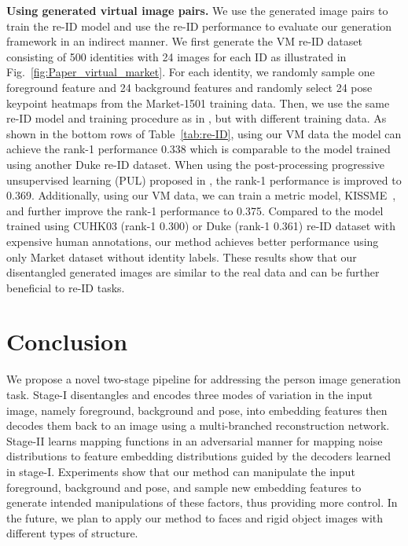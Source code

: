 \documentclass[10pt,twocolumn,letterpaper]{article}
\newcommand{\myparagraph}[1]{\vspace{0.0em}\noindent\textbf{#1}}
\begin{document}
\myparagraph{Using generated virtual image pairs.}
We use the generated image pairs to train the re-ID model and use the re-ID performance to evaluate our generation framework in an indirect manner. 
We first generate the VM re-ID dataset consisting of 500 identities with 24 images for each ID as illustrated in Fig.~\ref{fig:Paper_virtual_market}. 
For each identity, we randomly sample one foreground feature and 24 background features and randomly select 24 pose keypoint heatmaps from the Market-1501 training data.
Then, we use the same re-ID model and training procedure as in \cite{PUL}, but with different training data. 
As shown in the bottom rows of Table~\ref{tab:re-ID}, using our VM data the model can achieve the rank-1 performance 0.338 which is comparable to the model trained using another Duke re-ID dataset. 
When using the post-processing progressive unsupervised learning (PUL) proposed in \cite{PUL}, the rank-1 performance is improved to 0.369. 
Additionally, using our VM data, we can train a metric model, \eg KISSME~\cite{kissme}, and further improve the rank-1 performance to 0.375. 
Compared to the model trained using CUHK03 (rank-1 0.300) or Duke (rank-1 0.361) re-ID dataset with expensive human annotations, our method achieves better performance using only Market dataset without identity labels. 
These results show that our disentangled generated images are similar to the real data and can be further beneficial to re-ID tasks. 

\vspace{-0.5mm}
\section{Conclusion}
\vspace{-0.5mm}
\label{sec:conclusion}
We propose a novel two-stage pipeline for addressing the person image generation task. 
Stage-\RN{1} disentangles and encodes three modes of variation in the input image, namely foreground, background and pose, into embedding features then decodes them back to an image using a multi-branched reconstruction network. 
Stage-\RN{2} learns mapping functions in an adversarial manner for mapping noise distributions to feature embedding distributions guided by the decoders learned in stage-\RN{1}.
Experiments show that our method can manipulate the input foreground, background and pose, and sample new embedding features to generate intended manipulations of these factors, thus providing more control.
In the future, we plan to apply our method to faces and rigid object images with different types of structure.
\end{document}
